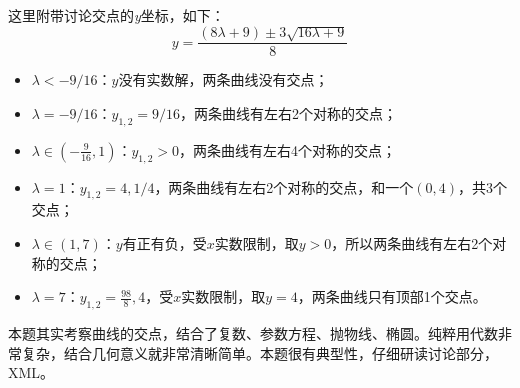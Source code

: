 这里附带讨论交点的{\it y}坐标，如下：
\[
y=\frac{\left( 8\lambda +9 \right) \pm 3\sqrt{16\lambda +9}}{8}
\]
\begin{itemize}
    \item $\lambda <-9/16$：$y$没有实数解，两条曲线没有交点；
    \item $\lambda =-9/16$：$y_{1,2}=9/16$，两条曲线有左右2个对称的交点；
    \item $\lambda \in \left( -\frac{9}{16},1 \right) $：$y_{1,2}>0$，两条曲线有左右4个对称的交点；
    \item $\lambda =1$：$y_{1,2}=4,1/4$，两条曲线有左右2个对称的交点，和一个$\left( 0,4 \right) $，共3个交点；
    \item $\lambda \in \left( 1,7 \right) $：$y$有正有负，受$x$实数限制，取$y>0$，所以两条曲线有左右2个对称的交点；
    \item $\lambda =7$：$y_{1,2}=\frac{98}{8},4$，受$x$实数限制，取$y=4$，两条曲线只有顶部1个交点。
\end{itemize}


\begin{tcolorbox}
本题其实考察曲线的交点，结合了复数、参数方程、抛物线、椭圆。纯粹用代数非常复杂，结合几何意义就非常清晰简单。本题很有典型性，仔细研读讨论部分，XML。
\end{tcolorbox}





